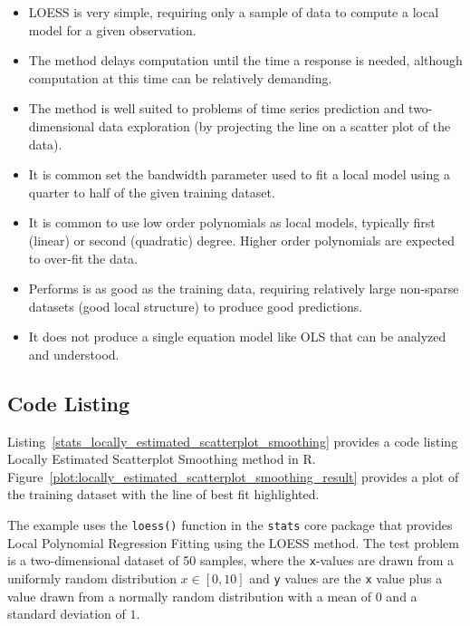 \begin{itemize}
	\item LOESS is very simple, requiring only a sample of data to compute a local model for a given observation.
	\item The method delays computation until the time a response is needed, although computation at this time can be relatively demanding.
	\item The method is well suited to problems of time series prediction and two-dimensional data exploration (by projecting the line on a scatter plot of the data).
	\item It is common set the bandwidth parameter used to fit a local model using a quarter to half of the given training dataset.
	\item It is common to use low order polynomials as local models, typically first (linear) or second (quadratic) degree. Higher order polynomials are expected to over-fit the data.
	\item Performs is as good as the training data, requiring relatively large non-sparse datasets (good local structure) to produce good predictions.
	\item It does not produce a single equation model like OLS that can be analyzed and understood.
\end{itemize}

\subsection{Code Listing}
Listing~\ref{stats_locally_estimated_scatterplot_smoothing} provides a code listing Locally Estimated Scatterplot Smoothing method in R.
Figure~\ref{plot:locally_estimated_scatterplot_smoothing_result} provides a plot of the training dataset with the line of best fit highlighted.

The example uses the \texttt{loess()} function in the \texttt{stats} core package that provides Local Polynomial Regression Fitting using the LOESS method.
The test problem is a two-dimensional dataset of 50 samples, where the \texttt{x}-values are drawn from a uniformly random distribution $x \in [0,10]$ and \texttt{y} values are the \texttt{x} value plus a value drawn from a normally random distribution with a mean of $0$ and a standard deviation of $1$.



